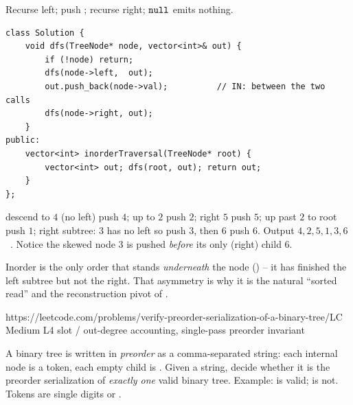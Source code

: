 Recurse left; push ; recurse right; $\texttt{null}$ emits nothing.

\begin{lstlisting}[caption={Inorder (LeetCode 94)}, label={lst:c03-inorder}]
class Solution {
    void dfs(TreeNode* node, vector<int>& out) {
        if (!node) return;
        dfs(node->left,  out);
        out.push_back(node->val);          // IN: between the two calls
        dfs(node->right, out);
    }
public:
    vector<int> inorderTraversal(TreeNode* root) {
        vector<int> out; dfs(root, out); return out;
    }
};
\end{lstlisting}

\begin{tracebox}[On $R$]
descend to $4$ (no left) push $4$; up to $2$ push $2$; right $5$ push $5$; up past $2$
to root push $1$; right subtree: $3$ has no left so push $3$, then $6$ push $6$.
Output $4,2,5,1,3,6$ \checkmark\ . Notice the skewed node $3$ is
pushed \emph{before} its only (right) child $6$.
\end{tracebox}


\begin{insightbox}
Inorder is the only order that stands \emph{underneath} the node ()
-- it has finished the left subtree but not the right. That asymmetry is why it is the
natural ``sorted read'' and the reconstruction pivot of .
\end{insightbox}

  {https://leetcode.com/problems/verify-preorder-serialization-of-a-binary-tree/}{LC Medium L4}
  {slot / out-degree accounting, single-pass preorder invariant}

\begin{problemstatement}
A binary tree is written in \emph{preorder} as a comma-separated string: each internal
node is a token, each empty child is . Given a string, decide whether it is the
preorder serialization of \emph{exactly one} valid binary tree. Example: \allowbreak
{} is valid; \allowbreak
{} is not. Tokens are single digits or .
\end{problemstatement}

